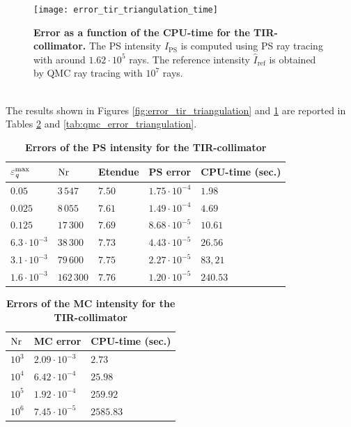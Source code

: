 \begin{figure}[h!]
  \center
  \texttt{[image: error\_tir\_triangulation\_time]}
  \caption{\textbf{Error as a function of the CPU-time for the TIR-collimator.} The PS intensity $\hat{I}_{\textrm{PS}}$ is computed using PS ray tracing with around $1.62\cdot 10^5$ rays. The reference intensity $\hat{I}_{\textrm{ref}}$ is obtained by QMC ray tracing with $10^7$ rays.}
  \label{fig:error_tir_triangulation_time}
\end{figure}
\\ \indent The results shown in Figures \ref{fig:error_tir_triangulation} and \ref{fig:error_tir_triangulation_time} are reported in Tables \ref{tab:ps_error_triangulation} and  \ref{tab:qmc_error_triangulation}.
\begin{table}[ht] 
\centering
\caption{\bf Errors of the PS intensity for the TIR-collimator}
\begin{tabular}{lllll}
 \hline   $\varepsilon_{\textit{q}}^{\textrm{max}} $  & $\textrm{Nr}$ & Etendue & PS error & CPU-time (sec.) \\
  \hline 
 $0.05$ & $3\,547$   & $7.50$   &  $1.75\cdot10^{-4}$ & $1.98$\\
$0.025$  & $8\,055$    & $7.61$    & $1.49\cdot 10^{-4}$ & $4.69$ \\
$0.125$  & $17\,300$    & $7.69$  & $8.68\cdot 10^{-5}$ & $10.61$\\
 $6.3 \cdot 10^{-3}$  & $38\,300$  & $7.73$   & $4.43\cdot 10^{-5}$ & $26.56$\\
 $3.1 \cdot 10^{-3}$ & $79\,600$  & $7.75$    & $2.27\cdot 10^{-5}$ & $83,21$\\
$1.6 \cdot 10^{-3}$ & $162\,300$  & $7.76$    & $1.20\cdot 10^{-5}$ & $240.53$\\
 \hline
 \end{tabular}
\label{tab:ps_error_triangulation}
 \end{table}
\begin{table}[ht] \label{tab:table_tir_triangulation}
\centering
\caption{\bf Errors of the MC intensity for the TIR-collimator}
\begin{tabular}{lll}
 \hline   $\textrm{Nr}$ & MC error & CPU-time (sec.) \\
  \hline 
 $10^3$     & $2.09\cdot 10^{-3}$ & $2.73$\\
 $10^4$     & $6.42\cdot 10^{-4}$ & $25.98$ \\
 $10^5$     & $1.92\cdot 10^{-4}$ & $259.92$\\
 $10^6$     & $7.45\cdot 10^{-5}$ & $2585.83$\\
 \hline
 \end{tabular}
 \label{tab:ps_error_triangulation}
 \end{table}
